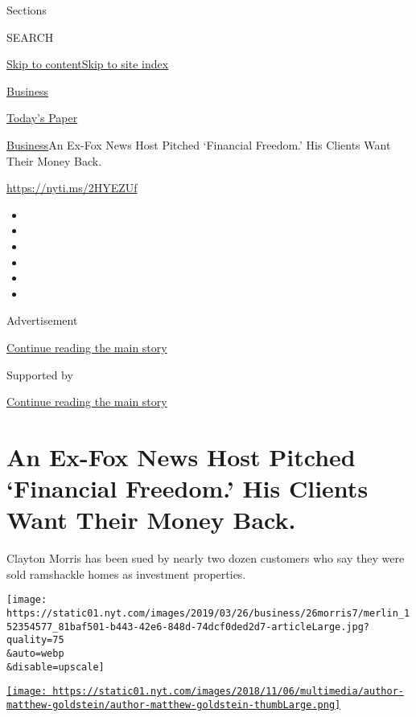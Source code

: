 Sections

SEARCH

\protect\hyperlink{site-content}{Skip to
content}\protect\hyperlink{site-index}{Skip to site index}

\href{https://www.nytimes.com/section/business}{Business}

\href{https://myaccount.nytimes.com/auth/login?response_type=cookie\&client_id=vi}{}

\href{https://www.nytimes.com/section/todayspaper}{Today's Paper}

\href{/section/business}{Business}\textbar{}An Ex-Fox News Host Pitched
`Financial Freedom.' His Clients Want Their Money Back.

\url{https://nyti.ms/2HYEZUf}

\begin{itemize}
\item
\item
\item
\item
\item
\item
\end{itemize}

Advertisement

\protect\hyperlink{after-top}{Continue reading the main story}

Supported by

\protect\hyperlink{after-sponsor}{Continue reading the main story}

\hypertarget{an-ex-fox-news-host-pitched-financial-freedom-his-clients-want-their-money-back}{%
\section{An Ex-Fox News Host Pitched `Financial Freedom.' His Clients
Want Their Money
Back.}\label{an-ex-fox-news-host-pitched-financial-freedom-his-clients-want-their-money-back}}

Clayton Morris has been sued by nearly two dozen customers who say they
were sold ramshackle homes as investment properties.

\texttt{[image: https://static01.nyt.com/images/2019/03/26/business/26morris7/merlin\_152354577\_81baf501-b443-42e6-848d-74dcf0ded2d7-articleLarge.jpg?quality=75\\\&auto=webp\\\&disable=upscale]}

\href{https://www.nytimes.com/by/matthew-goldstein}{\texttt{[image: https://static01.nyt.com/images/2018/11/06/multimedia/author-matthew-goldstein/author-matthew-goldstein-thumbLarge.png]}}

